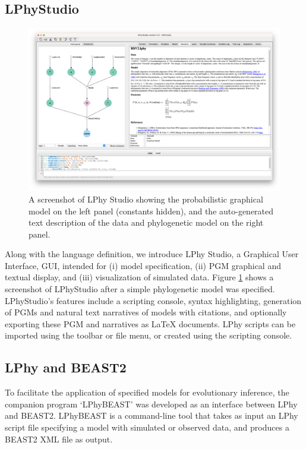 \documentclass[10pt,letterpaper,table]{article}
\theoremstyle{definition}
\begin{document}
\subsection{LPhyStudio} 
\begin{figure}[!h]
  \includegraphics[width=\textwidth]{figs_plos/RSV2.png}
  \caption{A screenshot of LPhy Studio showing the probabilistic graphical model 
  on the left panel (constants hidden), and the auto-generated text description of the data and phylogenetic model on the right panel.} 
  \label{fig:lphystudio}
\end{figure}
Along with the language definition, we introduce LPhy Studio, a Graphical User Interface, GUI, intended for (i) model specification, (ii) PGM graphical and textual display, and (iii) visualization of simulated data.
Figure \ref{fig:lphystudio} shows a screenshot of LPhyStudio after a simple phylogenetic model was specified. 
LPhyStudio's features include a scripting console, syntax highlighting, generation of PGMs and natural text narratives of models with citations, and optionally exporting these PGM and narratives as LaTeX documents. 
LPhy scripts can be imported using the toolbar or file menu, or created using the scripting console. 

\subsection{LPhy and BEAST2}
\label{sec:lphybeast}
To facilitate the application of specified models for evolutionary inference, the companion program `LPhyBEAST' was developed as an interface between LPhy and BEAST2.
LPhyBEAST is a command-line tool that takes as input an LPhy script file specifying a model with simulated or observed data, and produces a BEAST2 XML file as output.
\end{document}
